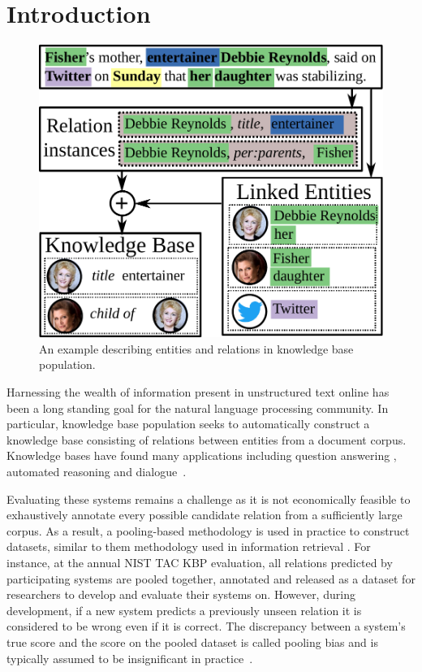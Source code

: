 \section{Introduction}
\label{sec:intro}

\begin{figure}[t]
  \centering
  \includegraphics[width=0.9\columnwidth]{figures/entities-example.pdf}
  \caption{\label{fig:example} An example describing entities and relations in knowledge base population.}
\end{figure}

Harnessing the wealth of information present in unstructured text online has been a long standing goal for the natural language processing community.
In particular, knowledge base population seeks to automatically construct a knowledge base consisting of relations between entities from a document corpus. %
Knowledge bases have found many applications including question answering \citep{berant2013freebase, fader2014open,reddy2014large}, automated reasoning \citep{kalyanpur2012structured} and dialogue~\citep{han2015exploiting}.

Evaluating these systems remains a challenge as it is not economically feasible to exhaustively annotate every possible candidate relation from a sufficiently large corpus.
As a result, a pooling-based methodology is used in practice to construct datasets, similar to them methodology used in information retrieval \citep{sparck1975report, harman1993trec}.
For instance, at the annual NIST TAC KBP evaluation, all relations predicted by participating systems are pooled together, annotated and released as a dataset for researchers to develop and evaluate their systems on.
However, during development, if a new system predicts a previously unseen relation it is considered to be wrong even if it is correct.
The discrepancy between a system's true score and the score on the pooled dataset is called pooling bias and is typically assumed to be insignificant in practice~\citep{zobel1998reliable}.

